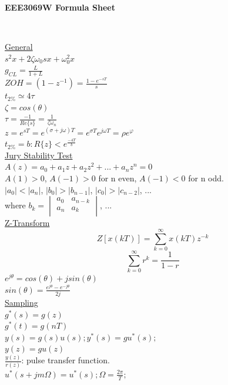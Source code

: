 \documentclass[a4paper, 10pt, titlepage]{article}
\begin{document}
\begin{center}
\begin{LARGE}
\textbf{EEE3069W Formula Sheet}
\end{LARGE} \\ \medskip
\end{center}



\begin{paracol}{3}[]
\underline{General} \\
$s^2x + 2 \zeta \omega_0sx + \omega_0^2x$ \\
$g_{CL} = \frac{L}{1+L}$ \\
$ZOH = (1-z^{-1}) = \frac{1 - e^{-sT}}{s}$ \\
$t_{2\%} \simeq 4\tau$ \\
$\zeta = cos(\theta)$ \\
$\tau = \frac{-1}{Re\{s\}} = \frac{1}{\zeta \omega_n}$ \\
$z=e^{sT}=e^{(\sigma + j \omega) T} = e^{\sigma T} e^{j \omega T} = \rho e^\varphi$\\
$t_{2\%}=b:R\{z\}<e^{\frac{-4T}{b}}$\\
\underline{Jury Stability Test} \\
$A(z) = a_0 + a_1z + a_2z^2 + ... + a_nz^n = 0$ \\
$A(1)>0$, $A(-1)>0$ for n even, $A(-1)<0$ for n odd. \\
$|a_0|<|a_n|$, $|b_0|>|b_{n-1}|$, $|c_0|>|c_{n-2}|$, ... \\
where $b_k = \begin{vmatrix}
a_0 & a_{n-k}\\
a_n & a_k\\
\end{vmatrix}$, ... \\
\underline{Z-Transform}
$$Z[x(kT)] = \sum^{\infty}_{k=0} x(kT)z^{-k}$$ 
$$\sum^{\infty}_{k=0} r^k = \frac{1}{1-r}$$
$e^{j\theta} = cos(\theta) + jsin(\theta)$ \\
$sin(\theta) = \frac{e^{j\theta} - e^{-j\theta}}{2j}$ \\
\underline{Sampling} \\
$g^*(s) = g(z)$ \\
$g^*(t) = g(nT)$ \\
$y(s)=g(s)u(s);y^*(s)=gu^*(s);$\\
$y(z)=gu(z)$\\
$\frac{y(z)}{r(z)}$: pulse transfer function.\\
$u^*(s+jm\Omega) = u^*(s);\Omega = \frac{2\pi}{T};$\\

\end{paracol}
\end{document}
